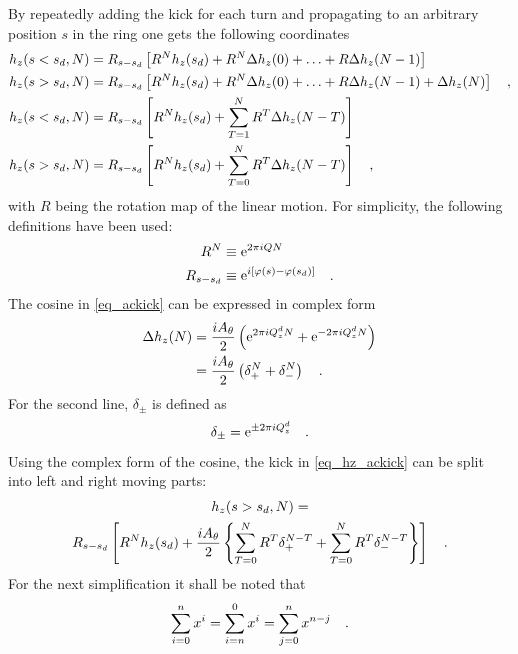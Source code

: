 By repeatedly adding the kick for each turn and propagating
to an arbitrary position $s$ in the ring one gets the following coordinates
%
\begin{align}
    h_z(s<s_d, N) &= R_{s-s_d}\left[R^N h_z(s_d) + R^N\Delta h_z(0) + \ldots + R\Delta h_z(N-1)\right] \notag\\
    h_z(s>s_d, N) &= R_{s-s_d}\left[R^N h_z(s_d) + R^N\Delta h_z(0) + \ldots + R\Delta h_z(N-1) + \Delta h_z(N)\right] 
    \quad ,\\
    h_z(s<s_d, N) &= R_{s-s_d}\left[R^N h_z(s_d) + \sum\limits_{T=1}^N R^T\Delta h_z(N-T)\right] \notag\\
    h_z(s>s_d, N) &= R_{s-s_d}\left[R^N h_z(s_d) + \sum\limits_{T=0}^N R^T\Delta h_z(N-T)\right]
    \quad ,
    \label{eq_hz_ackick}
\end{align}
%
with $R$ being the rotation map of the linear motion. For simplicity, the following definitions have been used:
%
\begin{align}
    R^N &\equiv \text{e}^{2\pi i Q N} \notag\\
    R_{s-s_d} &\equiv \text{e}^{i [\varphi(s) - \varphi(s_d)]}
    \quad .
\end{align}
%
The cosine in \eqref{eq_ackick} can be expressed in complex form
%
\begin{align}
    \Delta h_z(N) &= \frac{iA_\theta}{2} \left(
        \text{e}^{2\pi i Q^{d}_{z} N} +
        \text{e}^{-2\pi i Q^{d}_{z} N}
    \right) \notag\\
    &= \frac{iA_\theta}{2} \left(
        \delta_+^N + \delta_-^N
    \right)
    \quad .
\end{align}
%
For the second line, $\delta_\pm$ is defined as
%
\begin{equation}
    \delta_\pm = \text{e}^{\pm 2\pi i Q^{d}_{z}}
    \quad .
\end{equation}
%
Using the complex form of the cosine, the kick in \eqref{eq_hz_ackick} can be split into left and right moving parts:
%
\begin{multline}
    h_z(s>s_d, N) = \\
    R_{s-s_d}\left[
        R^N h_z(s_d) +
        \frac{iA_\theta}{2}\left\{
            \sum\limits_{T=0}^N R^T \delta_+^{N-T}
            + \sum\limits_{T=0}^N R^T \delta_-^{N-T}
        \right\}
        \right]
    \quad .
\end{multline}
%
For the next simplification it shall be noted that
%
\begin{equation}
    \sum\limits_{i=0}^n x^i = \sum\limits_{i=n}^0 x^i = \sum\limits_{j=0}^{n} x^{n-j}
    \quad .
\end{equation}
